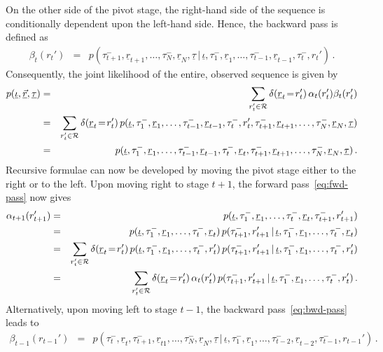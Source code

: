 \documentclass[a4paper]{article}
\newcommand{\ui}{\underline{\iota}}
\newcommand{\ut}{\underline{\tau}}
\newcommand{\ur}{\underline{r}}
\begin{document}
On the other side of the pivot stage, the right-hand side of the sequence is conditionally dependent upon the left-hand side.
Hence, the backward pass is defined as
\begin{eqnarray}
\beta_t(r_t') & = & p(\tau^-_{t+1},\ur_{t+1},\ldots,\tau^-_N,\ur_N,\ut\,|\,\ui,\tau_1^-,\ur_1,\ldots,\tau^-_{t-1},\ur_{t-1},\tau^-_t,r_t')\,.
\label{eq:bwd-pass}
\end{eqnarray}
Consequently, the joint likelihood of the entire, observed sequence is given by
\begin{eqnarray}
p(\ui,\underline{\vec{r}},\ut) & = & \sum_{r_t'\in{\cal R}}\delta(\ur_t\!=\!r_t')\,\alpha_t(r_t')\beta_t(r_t')
\nonumber\\
& = & \sum_{r_t'\in{\cal R}}\delta(\ur_t\!=\!r_t')\,p(\ui,\tau_1^-,\ur_1,\ldots,\tau^-_{t-1},\ur_{t-1},\tau^-_t,r_t',\tau^-_{t+1},\ur_{t+1},\ldots,\tau^-_N,\ur_N,\ut)
\nonumber\\
& = & p(\ui,\tau_1^-,\ur_1,\ldots,\tau^-_{t-1},\ur_{t-1},\tau^-_t,\ur_t,\tau^-_{t+1},\ur_{t+1},\ldots,\tau^-_N,\ur_N,\ut)\,.
\end{eqnarray}
Recursive formulae can now be developed by moving the pivot stage either to the right or to the left.
Upon moving right to stage $t+1$, the forward pass~\eqref{eq:fwd-pass} now gives
\begin{eqnarray}
\alpha_{t+1}(r_{t+1}') & = & p(\ui,\tau_1^-,\ur_1,\ldots,\tau^-_{t},\ur_{t},\tau^-_{t+1},r_{t+1}')
\nonumber\\
& = & p(\ui,\tau_1^-,\ur_1,\ldots,\tau^-_{t},\ur_{t})\,p(\tau^-_{t+1},r_{t+1}'\,|\,\ui,\tau_1^-,\ur_1,\ldots,\tau^-_{t},\ur_{t})
\nonumber\\
& = & \sum_{r_t'\in{\cal R}}\delta(\ur_t\!=\!r_t')\,p(\ui,\tau_1^-,\ur_1,\ldots,\tau^-_{t},r_{t}')\,p(\tau^-_{t+1},r_{t+1}'\,|\,\ui,\tau_1^-,\ur_1,\ldots,\tau^-_{t},r_{t}')
\nonumber\\
& = & \sum_{r_t'\in{\cal R}}\delta(\ur_t\!=\!r_t')\,\alpha_t(r_{t}')\,p(\tau^-_{t+1},r_{t+1}'\,|\,\ui,\tau_1^-,\ur_1,\ldots,\tau^-_{t},r_{t}')\,.
\label{eq:fwd-recursive}
\end{eqnarray}
Alternatively, upon moving left to stage $t-1$, the backward pass~\eqref{eq:bwd-pass} leads to
\begin{eqnarray}
\beta_{t-1}(r_{t-1}') & = & p(\tau^-_{t},\ur_{t},\tau^-_{t+1},\ur_{t1},\ldots,\tau^-_N,\ur_N,\ut\,|\,\ui,\tau_1^-,\ur_1,\ldots,\tau^-_{t-2},\ur_{t-2},\tau^-_{t-1},r_{t-1}')\,.
\label{eq:bwd-recursive}
\end{eqnarray}
\end{document}
